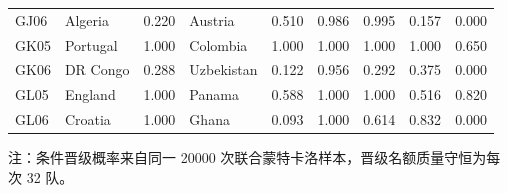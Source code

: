 \begin{table}[H]
{\begin{tabular}{llrlrrrrr}
GJ06 & Algeria & 0.220 & Austria & 0.510 & 0.986 & 0.995 & 0.157 & 0.000 \\
GK05 & Portugal & 1.000 & Colombia & 1.000 & 1.000 & 1.000 & 1.000 & 0.650 \\
GK06 & DR Congo & 0.288 & Uzbekistan & 0.122 & 0.956 & 0.292 & 0.375 & 0.000 \\
GL05 & England & 1.000 & Panama & 0.588 & 1.000 & 1.000 & 0.516 & 0.820 \\
GL06 & Croatia & 1.000 & Ghana & 0.093 & 1.000 & 0.614 & 0.832 & 0.000 \\
\bottomrule
\end{tabular}
}
\vspace{2pt}
\noindent\begin{minipage}{0.96\textwidth}\footnotesize 注：条件晋级概率来自同一 20000 次联合蒙特卡洛样本，晋级名额质量守恒为每次 32 队。\end{minipage}
\end{table}
